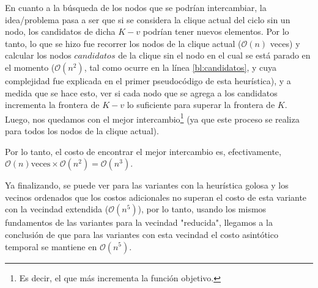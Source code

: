 \par En cuanto a la b\'usqueda de los nodos que se podr\'ian intercambiar,
    la idea/problema pasa a ser que si se considera la clique actual del ciclo
    sin un nodo, los candidatos de dicha $K-v$ podr\'ian tener nuevos elementos. Por
    lo tanto, lo que se hizo fue recorrer los nodos de la clique actual ($\mathcal O(n)$ veces) y
    calcular los nodos $candidatos$ de la clique sin el nodo en el cual se est\'a
    parado en el momento ($\mathcal O(n^2)$, tal como ocurre en la l\'inea
    \ref{bl:candidatos}, y cuya complejidad fue explicada en el primer
    pseudoc\'odigo de esta heur\'istica), y a medida que se hace esto,
    ver si cada nodo que se agrega a los candidatos incrementa la frontera de
    $K-v$ lo suficiente para superar la frontera de $K$. Luego, nos quedamos
    con el mejor intercambio\footnote{Es decir, el que m\'as incrementa la
    funci\'on objetivo.} (ya que este proceso se realiza para todos
    los nodos de la clique actual).

\par Por lo tanto, el costo de encontrar el mejor intercambio es, efectivamente,
    $\mathcal O(n)\text{veces} \times \mathcal O(n^2) = \mathcal O(n^3)$.

\par Ya finalizando, se puede ver para las variantes con la heur\'istica golosa
    y los vecinos ordenados que los costos adicionales no superan el costo
    de esta variante con la vecindad extendida ($\mathcal O(n^5)$), por lo tanto,
    usando los mismos fundamentos de las variantes para la vecindad "reducida",
    llegamos a la conclusi\'on de que para las variantes con esta vecindad el
    costo asint\'otico temporal se mantiene en $\mathcal O(n^5)$.
